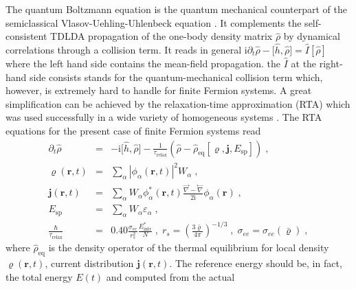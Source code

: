 \documentclass[final,1p]{elsarticle}
\begin{document}
The quantum Boltzmann equation is the quantum mechanical
counterpart of the
semiclassical Vlasov-Uehling-Uhlenbeck equation \cite{Ber88,Abe96}.
It complements the self-consistent TDLDA propagation 
of the one-body density matrix $\hat{\rho}$ by
dynamical correlations through a collision term. It reads in
general \cite{Rei85f,Goe86a}
$\mathrm{i}\partial_t\hat{\rho}
  -
  \big[\hat{h},\hat{\rho}\big]
  =
  \hat{I}[\hat{\rho}]
$
where the left hand side contains the mean-field propagation. the
$\hat{I}$ at the right-hand side consists stands for the
quantum-mechanical collision term which, however, is extremely hard to
handle for finite Fermion systems. A great simplification can be
achieved by the relaxation-time approximation (RTA) which was used
successfully in a wide variety of homogeneous systems
\cite{Pin66,Ash76}. The RTA equations for the present case of finite
Fermion systems read \cite{Rei15a}
\begin{subequations}
\label{eq:EoMbasic}
\begin{eqnarray}
  \partial_t\hat{\rho}
  &=&
  -\mathrm{i}\big[\hat{h},\hat{\rho}\big]
  -
  \frac{1}{\tau_\mathrm{relax}}
  \left(\hat{\rho}-\hat{\rho}_\mathrm{eq}[\varrho,\mathbf{j},E_\mathrm{sp}]\right)
  \;,
\label{eq:EoMbasicrho}
\\
  \varrho(\mathbf{r},t)
  &=&
  \sum_\alpha \left|\phi_\alpha(\mathbf{r},t)\right|^2 W_\alpha
  \;,
\label{eq:locdens}\\
  \mathbf{j}(\mathbf{r},t)
  &=&
  \sum_\alpha W_\alpha\phi_\alpha^*(\mathbf{r},t)
     \frac{\stackrel{\rightarrow}{\nabla}-\stackrel{\leftarrow}{\nabla}}
          {2\mathrm{i}}
     \phi_\alpha(\mathbf{r})
  \;,
\label{eq:current}\\
  E_\mathrm{sp}
  &=&
  \sum_\alpha W_\alpha\varepsilon_\alpha
  \;,
\\  
  \frac{\hbar}{\tau_\mathrm{relax}}
  &=&
  {0.40}\frac{\sigma_{ee}}{r_s^2}\frac{{E}^*_\mathrm{intr}}{N}
  \;,\;
  r_s=\left(\frac{3\bar{\varrho}}{4\pi}\right)^{-1/3}
  \;,\;
  \sigma_{ee}=\sigma_{ee}(\bar{\varrho})
  \;,
\label{eq:relaxtime}
\end{eqnarray}
\end{subequations}
where $\hat{\rho}_\mathrm{eq}$ is the density operator of the thermal
equilibrium for local density $\varrho(\mathbf{r},t)$, current
distribution $\mathbf{j}(\mathbf{r},t)$. The reference energy should
be, in fact, the total energy $E(t)$ and computed from the actual
\end{document}
